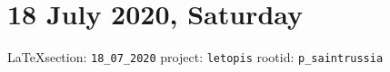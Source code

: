  
 

\section{18 July 2020, Saturday}

\vspace{0.5cm}
{\small\LaTeX section: \verb|18_07_2020| project: \verb|letopis| rootid: \verb|p_saintrussia|}
\vspace{0.5cm}



